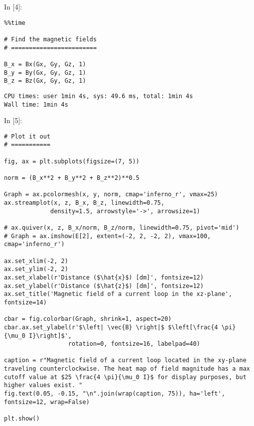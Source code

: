 \documentclass[11pt]{article}
\newif\ifcode
\newif\ifleftmargins
\newlength{\promptlength}
\newcommand{\prompt}[3]{
        \needspace{1.1cm}
        \settowidth{\promptlength}{ #1 [#3] }
        \ifleftmargins\hspace{-\promptlength}\hspace{-5pt}\fi
        {\color{#2}#1 [#3]:}
        \ifleftmargins\vspace{-2.7ex}\fi
    }
\begin{document}
    
\prompt{In}{incolor}{4}
\codetrue
\begin{tcolorbox}[breakable, size=fbox, boxrule=1pt, pad at break*=1mm, colback=cellbackground, colframe=cellborder]
\begin{verbatim}
%%time

# Find the magnetic fields
# ========================

B_x = Bx(Gx, Gy, Gz, 1)
B_y = By(Gx, Gy, Gz, 1)
B_z = Bz(Gx, Gy, Gz, 1)
\end{verbatim}
\end{tcolorbox}
\codefalse

    \begin{Verbatim}[commandchars=\\\{\}]
CPU times: user 1min 4s, sys: 49.6 ms, total: 1min 4s
Wall time: 1min 4s

    \end{Verbatim}

    
\prompt{In}{incolor}{5}
\codetrue
\begin{tcolorbox}[breakable, size=fbox, boxrule=1pt, pad at break*=1mm, colback=cellbackground, colframe=cellborder]
\begin{verbatim}
# Plot it out
# ===========

fig, ax = plt.subplots(figsize=(7, 5))

norm = (B_x**2 + B_y**2 + B_z**2)**0.5

Graph = ax.pcolormesh(x, y, norm, cmap='inferno_r', vmax=25)
ax.streamplot(x, z, B_x, B_z, linewidth=0.75,
             density=1.5, arrowstyle='->', arrowsize=1)

# ax.quiver(x, z, B_x/norm, B_z/norm, linewidth=0.75, pivot='mid')
# Graph = ax.imshow(E[2], extent=(-2, 2, -2, 2), vmax=100, cmap='inferno_r')

ax.set_xlim(-2, 2)
ax.set_ylim(-2, 2)
ax.set_xlabel(r'Distance ($\hat{x}$) [dm]', fontsize=12)
ax.set_ylabel(r'Distance ($\hat{z}$) [dm]', fontsize=12)
ax.set_title('Magnetic field of a current loop in the xz-plane', fontsize=14)

cbar = fig.colorbar(Graph, shrink=1, aspect=20)
cbar.ax.set_ylabel(r'$\left| \vec{B} \right|$ $\left[\frac{4 \pi}{\mu_0 I}\right]$', 
                  rotation=0, fontsize=16, labelpad=40)

caption = r"Magnetic field of a current loop located in the xy-plane traveling counterclockwise. The heat map of field magnitude has a max cutoff value at $25 \frac{4 \pi}{\mu_0 I}$ for display purposes, but higher values exist. "
fig.text(0.05, -0.15, "\n".join(wrap(caption, 75)), ha='left', fontsize=12, wrap=False)

plt.show()
\end{verbatim}
\end{tcolorbox}
\codefalse
\end{document}
